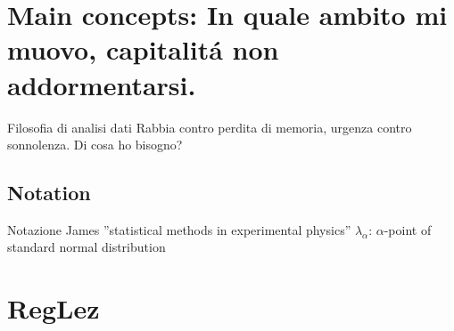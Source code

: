 \section{Main concepts: In quale ambito mi muovo, capitalit\'a non addormentarsi.}

\begin{frame}{Filosofia di analisi dati}
Rabbia contro perdita di memoria, urgenza contro sonnolenza. Di cosa ho bisogno?
\end{frame}

\subsection{Notation}

\begin{wordonframe}{Notazione James ''statistical methods in experimental physics''}
$\lambda_{\alpha}$: $\alpha$-point of standard normal distribution
\end{wordonframe}

\section{RegLez}
